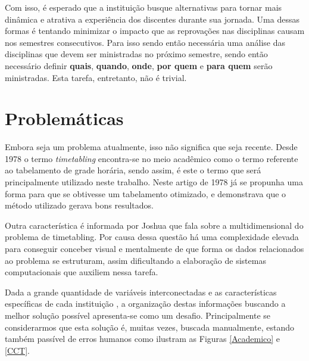 Com isso, é esperado que a instituição busque alternativas para tornar mais dinâmica e atrativa a experiência dos discentes durante sua jornada. Uma dessas formas é tentando minimizar o impacto que as reprovações nas disciplinas causam nos semestres consecutivos. Para isso sendo então necessária uma análise das disciplinas que devem ser ministradas no próximo semestre, sendo então necessário definir \textbf{quais}, \textbf{quando}, \textbf{onde}, \textbf{por quem} e \textbf{para quem} serão ministradas. Esta tarefa, entretanto, não é trivial.

\section{Problemáticas} %

Embora seja um problema atualmente, isso não significa que seja recente. Desde 1978 \cite{barham_simple_1978} o termo \textit{timetabling} encontra-se no meio acadêmico como o termo referente ao tabelamento de grade horária, sendo assim, é este o termo que será principalmente utilizado neste trabalho. Neste artigo de 1978 já se propunha uma forma para que se obtivesse um tabelamento otimizado, e demonstrava que o método utilizado gerava bons resultados.

Outra característica é informada por Joshua \cite{thomas_visualization_2009} que fala sobre a multidimensional do problema de timetabling. Por causa dessa questão há uma complexidade elevada para conseguir conceber visual e mentalmente de que forma os dados relacionados ao problema se estruturam, assim dificultando a elaboração de sistemas computacionais que auxiliem nessa tarefa.

Dada a grande quantidade de variáveis interconectadas e as características específicas de cada instituição \cite{miranda_udpskeduler_2012}, a organização destas informações buscando a melhor solução possível apresenta-se como um desafio. Principalmente se considerarmos que esta solução é, muitas vezes, buscada manualmente, estando também passível de erros humanos como ilustram as Figuras \ref{Academico} e \ref{CCT}.



